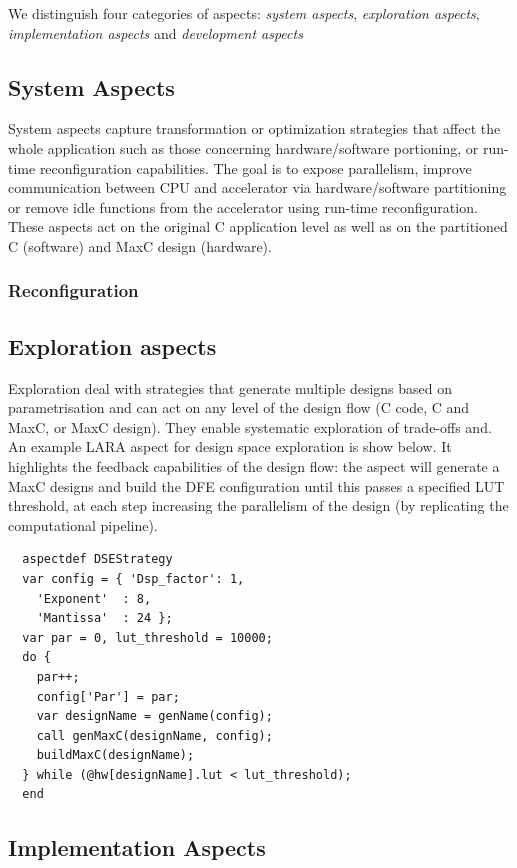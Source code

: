 We distinguish four categories of aspects: \emph{system aspects},
\emph{exploration aspects}, \emph{implementation aspects} and
\emph{development aspects}

\subsection{System Aspects}

System aspects capture transformation or optimization strategies that
affect the whole application such as those concerning
hardware/software portioning, or run-time reconfiguration
capabilities. The goal is to expose parallelism, improve communication
between CPU and accelerator via hardware/software partitioning or
remove idle functions from the accelerator using run-time
reconfiguration. These aspects act on the original C application level
as well as on the partitioned C (software) and MaxC design (hardware).


\subsubsection{\TODO Reconfiguration}

\subsection{Exploration aspects}

Exploration deal with strategies that generate multiple designs based
on parametrisation and can act on any level of the design flow (C
code, C and MaxC, or MaxC design). They enable systematic exploration
of trade-offs and. An example LARA aspect for design space exploration
is show below. It highlights the feedback capabilities of the design
flow: the aspect will generate a MaxC designs and build the DFE
configuration until this passes a specified LUT threshold, at each
step increasing the parallelism of the design (by replicating the
computational pipeline).

\begin{lstlisting}
  aspectdef DSEStrategy
  var config = { 'Dsp_factor': 1,
    'Exponent'  : 8,
    'Mantissa'  : 24 };
  var par = 0, lut_threshold = 10000;
  do {
    par++;
    config['Par'] = par;
    var designName = genName(config);
    call genMaxC(designName, config);
    buildMaxC(designName);
  } while (@hw[designName].lut < lut_threshold);
  end
\end{lstlisting}

\subsection{Implementation Aspects}

